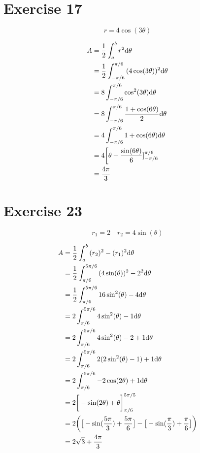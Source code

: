 \documentclass[letterpaper, 12pt]{math}
\begin{document}
\section*{Exercise 17}
\[ r = 4\cos(3\theta) \]
\begin{center}
\end{center}
\begin{align*}
  A &= \frac{1}{2}\int_{a}^{b}{r^{2}\mathrm{d}{\theta}} \\
  &= \frac{1}{2}\int_{-\pi/6}^{\pi/6}{(4\cos(3\theta))^{2}\mathrm{d}{\theta}} \\
  &= 8\int_{-\pi/6}^{\pi/6}{\cos^{2}(3\theta)\mathrm{d}{\theta}} \\
  &= 8\int_{-\pi/6}^{\pi/6}{\frac{1+\cos(6\theta)}{2}\mathrm{d}{\theta}} \\
  &= 4\int_{-\pi/6}^{\pi/6}{1+\cos(6\theta)\mathrm{d}{\theta}} \\
  &= 4\bigg[\theta+\frac{\sin(6\theta)}{6}]_{-\pi/6}^{\pi/6} \\
  &= \frac{4\pi}{3}
\end{align*}

\section*{Exercise 23}
\[ r_{1} = 2 \quad r_{2} = 4\sin(\theta) \]
\begin{center}
\end{center}
\begin{align*}
  A &= \frac{1}{2}\int_{a}^{b}{(r_{2})^{2}-(r_{1})^{2}\mathrm{d}{\theta}} \\
  &= \frac{1}{2}\int_{\pi/6}^{5\pi/6}{(4\sin(\theta))^{2}-2^{2}\mathrm{d}{\theta}} \\
  &= \frac{1}{2}\int_{\pi/6}^{5\pi/6}{16\sin^{2}(\theta)-4\mathrm{d}{\theta}} \\
  &= 2\int_{\pi/6}^{5\pi/6}{4\sin^{2}(\theta)-1\mathrm{d}{\theta}} \\
  &= 2\int_{\pi/6}^{5\pi/6}{4\sin^{2}(\theta)-2+1\mathrm{d}{\theta}} \\
  &= 2\int_{\pi/6}^{5\pi/6}{2(2\sin^{2}(\theta)-1)+1\mathrm{d}{\theta}} \\
  &= 2\int_{\pi/6}^{5\pi/6}{-2\cos(2\theta)+1\mathrm{d}{\theta}} \\
  &= 2\bigg[-\sin(2\theta)+\theta\bigg]_{\pi/6}^{5\pi/5} \\
  &= 2\bigg(\big[-\sin(\frac{5\pi}{3})+\frac{5\pi}{6}\big]-
    \big[-\sin(\frac{\pi}{3})+\frac{\pi}{6}\big]\bigg) \\
  &= 2\sqrt{3}+\frac{4\pi}{3}
\end{align*}
\end{document}
